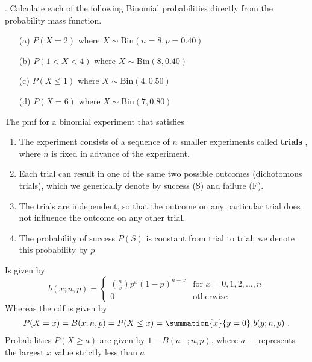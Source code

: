 \documentclass{report}
\begin{document}
 \pagebreak \bigbreak \noindent 
 \begin{mdframed}
     . Calculate each of the following Binomial probabilities directly from the probability mass function.
     \begin{itemize}
         \item[(a)] \( P(X = 2) \) where \( X \sim \text{Bin}(n = 8, p = 0.40) \)
         \item[(b)] \( P(1 < X < 4) \) where \( X \sim \text{Bin}(8, 0.40) \)
         \item[(c)] \( P(X \leq 1) \) where \( X \sim \text{Bin}(4, 0.50) \)
         \item[(d)] \( P(X = 6) \) where \( X \sim \text{Bin}(7, 0.80) \)
     \end{itemize}
 \end{mdframed}
 \bigbreak \noindent 
 \begin{remark}
     The pmf for a binomial experiment that satisfies 
     \begin{enumerate}
         \item The experiment consists of a sequence of $n$ smaller experiments called \textbf{trials} , where $n$ is fixed in advance of the experiment.
         \item Each trial can result in one of the same two possible outcomes (dichotomous trials), which we generically denote by success (S) and failure (F).
         \item The trials are independent, so that the outcome on any particular trial does not influence the outcome on any other trial.
         \item The probability of success $P(S)$ is constant from trial to trial; we denote this probability by $p$
     \end{enumerate}
     Is given by
     \[
         b(x; n, p) =
         \begin{cases} 
             \binom{n}{x} p^x (1 - p)^{n - x} & \text{for } x = 0, 1, 2, \ldots, n \\
             0 & \text{otherwise}
         \end{cases}
     \]
     \bigbreak \noindent 
     Whereas the cdf is given by 
     \begin{align*}
         P(X = x) = B(x; n,p) = P(X \leq x) = \summation{x}{y=0}\ b(y;n,p)\
     .\end{align*}
     \bigbreak \noindent 
     Probabilities $P(X \geq a)$ are given by $1-B(a-;n,p)$, where $a-$ represents the largest $x$ value strictly less than $a$
 \end{remark}
\end{document}
